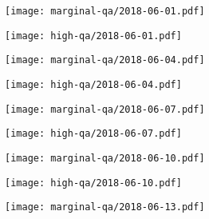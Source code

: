 \documentclass{article}
\begin{document}
\begin{figure}[H]
	\ContinuedFloat
	\centering
	\begin{subfigure}{0.48\linewidth}
		\texttt{[image: marginal-qa/2018-06-01.pdf]}
	\end{subfigure}
	\begin{subfigure}{0.48\linewidth}
		\texttt{[image: high-qa/2018-06-01.pdf]}
	\end{subfigure}
	\begin{subfigure}{0.48\linewidth}
		\texttt{[image: marginal-qa/2018-06-04.pdf]}
	\end{subfigure}
	\begin{subfigure}{0.48\linewidth}
		\texttt{[image: high-qa/2018-06-04.pdf]}
	\end{subfigure}
	\begin{subfigure}{0.48\linewidth}
		\texttt{[image: marginal-qa/2018-06-07.pdf]}
	\end{subfigure}
	\begin{subfigure}{0.48\linewidth}
		\texttt{[image: high-qa/2018-06-07.pdf]}
	\end{subfigure}
	\begin{subfigure}{0.48\linewidth}
		\texttt{[image: marginal-qa/2018-06-10.pdf]}
	\end{subfigure}
	\begin{subfigure}{0.48\linewidth}
		\texttt{[image: high-qa/2018-06-10.pdf]}
	\end{subfigure}
	\begin{subfigure}{\linewidth}
		\texttt{[image: marginal-qa/2018-06-13.pdf]}
	\end{subfigure}
\end{figure}
\end{document}
